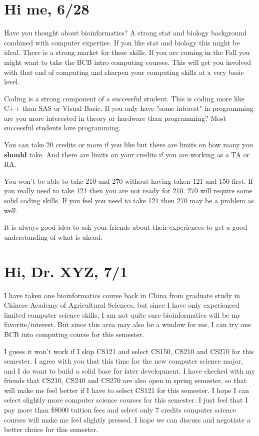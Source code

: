 \documentclass[12pt]{book}
\begin{document}
\section{Hi me,    6/28}
\label{sec-2-4}

Have you thought about bioinformatics?   A strong stat and biology background combined with computer expertise. If you like stat and biology this might be ideal.   There is a strong market for these skills.  If you are coming in the Fall you might want to take the BCB intro computing courses. This will get you involved with that end of computing and sharpen your computing skills at a very basic level.

Coding is a strong component of a successful student.   This is coding more like C++ than SAS or Visual Basic.  If you only have "some interest" in programming are you more interested in theory or hardware than programming?   Most successful students love programming.

You can take 20 credits or more if you like but there are limits on how many you \textbf{should} take.   And there are limits on your credits if you are working as a TA or RA.

You won't be able to take 210 and 270 without having taken 121 and 150 first.    
If you really need to take 121 then you are not ready for 210.    
270 will require some solid coding skills. If you feel you need to take 121 then 270 may be a problem as well.

It is always good idea to ask your friends about their experiences to get a good understanding of what is ahead.


\section{Hi, Dr. XYZ,   7/1}
\label{sec-2-5}

I have taken one bioinformatics course back in China from graduate study in Chinese Academy of Agricultural Sciences, but since I have only experienced limited computer science skills, I am not quite sure bioinformatics will be my favorite/interest. But since this area may also be a window for me, I can try one BCB into computing course for this semester.

I guess it won’t work if I skip CS121 and select CS150, CS210 and CS270 for this semester. I agree with you that this time for the new computer science major, and I do want to build a solid base for later development. I have checked with my friends that CS210, CS240 and CS270 are also open in spring semester, so that will make me feel better if I have to select CS121 for this semester. I hope I can select slightly more computer science courses for this semester. I just feel that I pay more than \$8000 tuition fees and select only 7 credits computer science courses  will make me feel slightly pressed. I hope we can discuss and negotiate a better choice for this semester.  
\end{document}
